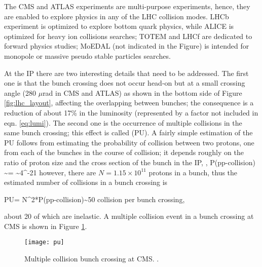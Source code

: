 The CMS and ATLAS experiments are multi-purpose experiments, hence, they are enabled to explore physics in any of the LHC collision modes. LHCb experiment is optimized to explore bottom quark physics, while ALICE is optimized for heavy ion collisions searches; TOTEM and LHCf are dedicated to forward physics studies; MoEDAL (not indicated in the Figure) is intended for monopole or massive pseudo stable particles searches.

At the IP there are two interesting details that need to be addressed. The first one is that the bunch crossing does not occur head-on but at a small crossing angle  (280 $\mu$rad in CMS and ATLAS) as shown in the bottom side of Figure \ref{fig:lhc_layout}, affecting the overlapping between bunches; the consequence is a reduction of about 17\% in the luminosity (represented by a factor not included in eqn. \ref{eq:lumi}). The second one is the occurrence of multiple \pp collisions in the same bunch crossing; this effect is called  (PU). A fairly simple estimation of the PU follows from estimating the probability of collision between two protons, one from each of the bunches in the course of collision; it depends roughly on the ratio of proton size and the cross section of the bunch in the IP, \ie,
\beqn
P(pp-collision) \sim {}= \sim 4^{-21}
\eeqn
\noindent however, there are $N=1.15\times 10^{11}$ protons in a bunch, thus the estimated number of collisions in a bunch crossing is

\beqn
PU= N^2*P(pp-collision)\sim 50  \textrm{\pp collision per bunch crossing},
\eeqn

\noindent about 20 of which are inelastic. %
A multiple \pp collision event in a bunch crossing at CMS is shown in Figure \ref{fig:pu}. %

\begin{figure}[!h]
\centering
\texttt{[image: pu]}
\caption [Multiple \pp collision bunch crossing at CMS.]{Multiple \pp collision bunch crossing at CMS. %
\cite{pu}. }\label{fig:pu}
\end{figure}

